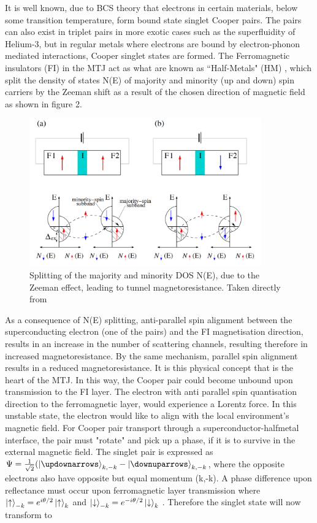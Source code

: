 \documentclass[12pt]{article}
\begin{document}
It is well known, due to BCS theory \cite{BCS} that electrons in certain materials, below some transition temperature, form bound state singlet Cooper pairs. The pairs can also exist in triplet pairs in more exotic cases such as the superfluidity of Helium-3, but in regular metals where electrons are bound by electron-phonon mediated interactions, Cooper singlet states are formed. The Ferromagnetic insulators (FI) in the MTJ act as what are known as ``Half-Metals" (HM) \cite{HM}, which split the density of states N(E) of majority and minority (up and down) spin carriers by the Zeeman shift as a result of the chosen direction of magnetic field as shown in figure 2. 
\begin{figure}[htp]
    \centering
    \begin{measuredfigure}
    \includegraphics[width=10cm]{dos}
    \caption{Splitting of the majority and minority DOS N(E), due to the Zeeman effect, leading to tunnel magnetoresistance. Taken directly from \cite{fundapp}}
    \end{measuredfigure}
    \end{figure}
As a consequence of N(E) splitting, anti-parallel spin alignment between the superconducting electron (one of the pairs) and the FI magnetisation direction, results in an increase in the number of scattering channels, resulting therefore in increased magnetoresistance. By the same mechanism, parallel spin alignment results in a reduced magnetoresistance. It is this physical concept that is the heart of the MTJ. In this way, the Cooper pair could become unbound upon transmission to the FI layer. The electron with anti parallel spin quantisation direction to the ferromagnetic layer, would experience a Lorentz force. In this unstable state, the electron would like to align with the local environment's magnetic field. For Cooper pair transport through a superconductor-halfmetal\cite{HM} interface, the pair must "rotate" and pick up a phase, if it is to survive in the external magnetic field. The singlet pair is expressed as $\Psi=\frac{1}{\sqrt{2}}(\ket{\updownarrows}_{k,-k}- \ket{\downuparrows}_{k,-k}$, where the opposite electrons also have opposite but equal momentum (k,-k)\cite{BCS}. A phase difference upon reflectance must occur upon ferromagnetic layer transmission where $\ket{\uparrow}_{-k}=e^{i\theta/2}\ket{\uparrow}_k$ and $\ket{\downarrow}_{-k}=e^{-i\theta/2}\ket{\downarrow}_k$ \cite{contact}. Therefore the singlet state will now transform to
\end{document}
